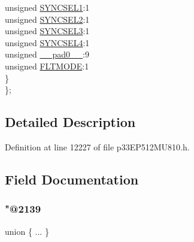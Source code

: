 \begin{DoxyCompactItemize}
\begin{tabbing}
\>\>unsigned \hyperlink{structtag_o_c16_c_o_n2_b_i_t_s_a50e73f95ab1c258ddc64f69c0991deaf}{SYNCSEL1}:1\\
\>\>unsigned \hyperlink{structtag_o_c16_c_o_n2_b_i_t_s_a304907a5d2c4cbf1114a54642a85951e}{SYNCSEL2}:1\\
\>\>unsigned \hyperlink{structtag_o_c16_c_o_n2_b_i_t_s_a6bbd1bd2ead6c9fa713969c6eb0f0c75}{SYNCSEL3}:1\\
\>\>unsigned \hyperlink{structtag_o_c16_c_o_n2_b_i_t_s_a0cd5bbe196c7974953909d27a6307bb7}{SYNCSEL4}:1\\
\>\>unsigned \hyperlink{structtag_o_c16_c_o_n2_b_i_t_s_adf71f3d8410c1f1dbbc96680a92c49af}{\_\_pad0\_\_}:9\\
\>\>unsigned \hyperlink{structtag_o_c16_c_o_n2_b_i_t_s_ad53c2a5303780172219bfd5e0100c782}{FLTMODE}:1\\
\>\} \\
\}; \\

\end{tabbing}\end{DoxyCompactItemize}


\subsection{Detailed Description}


Definition at line 12227 of file p33\+E\+P512\+M\+U810.\+h.



\subsection{Field Documentation}
\mbox{\label{structtag_o_c16_c_o_n2_b_i_t_s_afa981e028e99e0967cc1fa67a2efee71}} 
\subsubsection{\texorpdfstring{"@2139}{@2139}}
{\footnotesize\ttfamily union \{ ... \} }

\mbox{\label{structtag_o_c16_c_o_n2_b_i_t_s_adf71f3d8410c1f1dbbc96680a92c49af}} 
